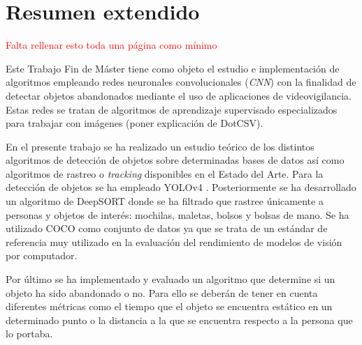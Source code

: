 
\chapter*{Resumen extendido}
\label{cha:resumen-extendido}


\textcolor{red}{Falta rellenar esto toda una página como mínimo}

Este Trabajo Fin de Máster tiene como objeto el estudio e implementación de algoritmos empleando redes neuronales convolucionales (\textit{CNN}) con la finalidad de detectar objetos abandonados mediante el uso de aplicaciones de videovigilancia. Estas redes se tratan de algoritmos de aprendizaje supervisado especializados para trabajar con imágenes (poner explicación de DotCSV).

En el presente trabajo se ha realizado un estudio teórico de los distintos algoritmos de detección de objetos sobre determinadas bases de datos así como algoritmos de rastreo o \textit{tracking} disponibles en el Estado del Arte. Para la detección de objetos se ha empleado YOLOv4 \cite{bochkovskiy2020yolov4}. Posteriormente se ha desarrollado un algoritmo de DeepSORT \cite{Wojke2017simple} donde se ha filtrado que rastree únicamente a personas y objetos de interés: mochilas, maletas, bolsos y bolsas de mano. Se ha utilizado COCO \cite{lin2015microsoft} como conjunto de datos ya que se trata de un estándar de referencia muy utilizado en la evaluación del rendimiento de modelos de visión por computador.

Por último se ha implementado y evaluado un algoritmo que determine si un objeto ha sido abandonado o no. Para ello se deberán de tener en cuenta diferentes métricas como el tiempo que el objeto se encuentra estático en un determinado punto o la distancia a la que se encuentra respecto a la persona que lo portaba.
